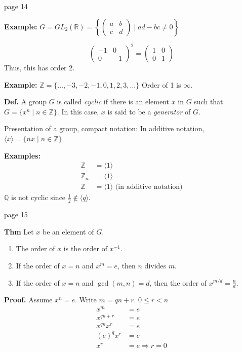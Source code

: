 \documentclass{article}
\begin{document}
\newpage
\noindent page 14

\textbf{Example:} $G = GL_2(\mathbb{R}) = \left\{ \begin{pmatrix} a & b \\ c & d \end{pmatrix} \mid ad - bc \neq 0 \right\}$

\[
\begin{pmatrix}
    -1 & 0 \\
    0 & -1
\end{pmatrix}^2 = 
\begin{pmatrix}
    1 & 0 \\
    0 & 1
\end{pmatrix}
\]
Thus, this has order 2.

\textbf{Example:} $\mathbb{Z} = \{\ldots, -3, -2, -1, 0, 1, 2, 3, \ldots\}$ Order of 1 is $\infty$.

\textbf{Def.} A group $G$ is called \textit{cyclic} if there is an element $x$ in $G$ such that $G = \{x^n \mid n \in \mathbb{Z}\}$. In this case, $x$ is said to be a \textit{generator} of $G$.

Presentation of a group, compact notation:
In additive notation, $\langle x \rangle = \{nx \mid n \in \mathbb{Z}\}$.

\textbf{Examples:}
\[
\begin{aligned}
    \mathbb{Z} &= \langle 1 \rangle \\
    \mathbb{Z}_n &= \langle 1 \rangle \\
    \mathbb{Z} &= \langle 1 \rangle \text{ (in additive notation)}
\end{aligned}
\]
$\mathbb{Q}$ is not cyclic since $\frac{1}{2} \notin \langle q \rangle$.

\newpage
\noindent page 15

\textbf{Thm} Let $x$ be an element of $G$.
\begin{enumerate}
    \item The order of $x$ is the order of $x^{-1}$.
    \item If the order of $x = n$ and $x^m = e$, then $n$ divides $m$.
    \item If the order of $x = n$ and $\gcd(m, n) = d$, then the order of $x^{m/d} = \frac{n}{d}$.
\end{enumerate}

\textbf{Proof.} Assume $x^n = e$. Write $m = qn + r$. $0 \leq r < n$
\[
\begin{aligned}
    x^m &= e \\
    x^{qn+r} &= e \\
    x^{qn}x^r &= e \\
    (e)^q x^r &= e \\
    x^r &= e \Rightarrow r = 0
\end{aligned}
\]
\end{document}
